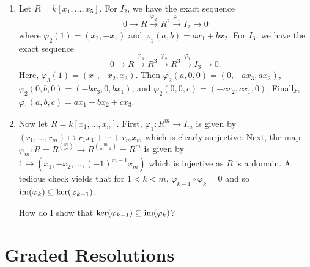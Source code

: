 \documentclass[letterpaper, 11pt, oneside]{book}
\begin{document}
\begin{sol}\label{ex:UAG_6.2.10}
  \begin{enumerate}
    \item Let $R = k[x_{1}, \ldots, x_{5}]$.
          For $I_{2}$, we have the exact sequence
          \[
            0 \to R \xrightarrow{\varphi_{2}} R^{2} \xrightarrow{\varphi_{1}} I_{2} \to 0
          \]
          where $\varphi_{2}(1) = (x_{2}, -x_{1})$ and $\varphi_{1}(a, b) = ax_{1} + bx_{2}$.
          For $I_{3}$, we have the exact sequence
          \[
            0 \to R \xrightarrow{\varphi_{3}} R^{3} \xrightarrow{\varphi_{2}} R^{3} \xrightarrow{\varphi_{1}} I_{3} \to 0.
          \]
          Here, $\varphi_{3}(1) = (x_{1}, -x_{2}, x_{3})$.
          Then $\varphi_{2}(a, 0, 0) = (0, -ax_{3}, ax_{2})$, $\varphi_{2}(0, b, 0) = (-bx_{3}, 0, bx_{1})$, and $\varphi_{2}(0, 0, c) = (-cx_{2}, cx_{1}, 0)$.
          Finally, $\varphi_{1}(a, b, c) = ax_{1} + bx_{2} + cx_{3}$.
    \item Now let $R = k[x_{1}, \ldots, x_{n}]$.
          First, $\varphi_{1}\colon R^{m} \to I_{m}$ is given by $(r_{1}, \ldots, r_{m}) \mapsto r_{1}x_{1} + \cdots + r_{m}x_{m}$ which is clearly surjective.
          Next, the map $\varphi_{m}\colon R = R^{\binom{m}{m}} \to R^{\binom{m}{m - 1}} = R^{m}$ is given by $1 \mapsto (x_{1}, -x_{2}, \ldots, (-1)^{m - 1} x_{m})$ which is injective as $R$ is a domain.
          A tedious check yields that for $1 < k < m$, $\varphi_{k - 1} \circ \varphi_{k} = 0$ and so $\operatorname{im}(\varphi_{k}) \subseteq \ker(\varphi_{k - 1})$.

           How do I show that $\ker(\varphi_{k - 1}) \subseteq \operatorname{im}(\varphi_{k})$?
  \end{enumerate}
\end{sol}

\clearpage

\section{Graded Resolutions}
\end{document}
